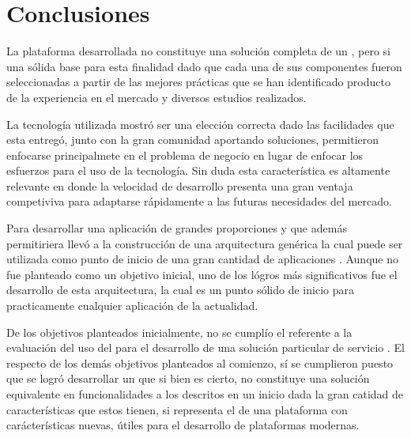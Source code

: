 

\chapter{Conclusiones} \label{cap:conclusiones}
	
	La plataforma desarrollada no constituye una solución completa de un \frameworkPC \ecommerceCOM, pero si una sólida base para esta finalidad dado que cada una de sus componentes fueron seleccionadas a partir de las mejores prácticas que se han identificado producto de la experiencia en el mercado y diversos estudios realizados.

	La tecnología utilizada mostró ser una elección correcta dado las facilidades que esta entregó, junto con la gran comunidad aportando soluciones, permitieron enfocarse principalmete en el problema de negocio en lugar de enfocar los esfuerzos para el uso de la tecnología. Sin duda esta característica es altamente relevante en donde la velocidad de desarrollo presenta una gran ventaja competiviva para adaptarse rápidamente a las futuras necesidades del mercado.

	Para desarrollar una aplicación de grandes proporciones y que además permitiriera llevó a la construcción de una arquitectura genérica la cual puede ser utilizada como punto de inicio de una gran cantidad de aplicaciones \webINT.  
	Aunque no fue planteado como un objetivo inicial, uno de los lógros más significativos fue el desarrollo de esta arquitectura, la cual es un punto sólido de inicio para practicamente cualquier aplicación \webINT de la actualidad.

	De los objetivos planteados inicialmente, no se cumplío el referente a la evaluación del uso del \frameworkPC para el desarrollo de una solución particular de servicio \ecommerceCOM.
	El respecto de los demás objetivos planteados al comienzo, sí se cumplieron puesto que se logró desarrollar un \frameworkPC que si bien es cierto, no constituye una solución equivalente en funcionalidades a los \frameworkPC descritos en un inicio dada la gran catidad de características que estos tienen, si representa el \coreAS de una plataforma con carácterísticas nuevas, útiles para el desarrollo de plataformas modernas.

